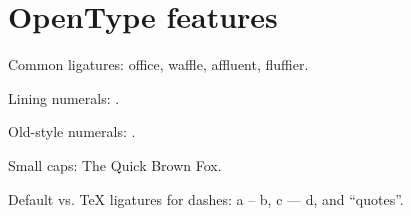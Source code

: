 \documentclass[12pt]{article}
\begin{document}
\section*{OpenType features}

Common ligatures: office, waffle, affluent, fluffier.

Lining numerals: {}.

Old-style numerals: {}.

Small caps: {\scfont The Quick Brown Fox}.

Default vs. TeX ligatures for dashes: a -- b, c --- d, and ``quotes''.
\end{document}
